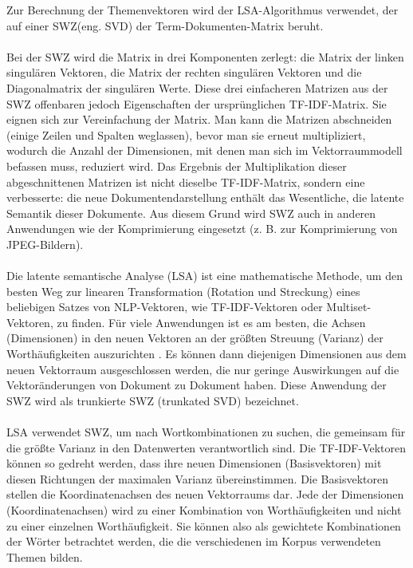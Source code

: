 Zur Berechnung der Themenvektoren wird der \ac{LSA}-Algorithmus verwendet, der auf einer \ac{SWZ}(eng. \ac{SVD}) der Term-Dokumenten-Matrix beruht.\\\\
Bei der \ac{SWZ} wird die Matrix in drei Komponenten zerlegt: die Matrix der linken singulären Vektoren, die Matrix der rechten singulären Vektoren und die Diagonalmatrix der singulären Werte. 
Diese drei einfacheren Matrizen aus der \ac{SWZ} offenbaren jedoch Eigenschaften der ursprünglichen \ac{TF-IDF}-Matrix. 
Sie eignen sich zur Vereinfachung der Matrix. 
Man kann die Matrizen abschneiden (einige Zeilen und Spalten weglassen), bevor man sie erneut multipliziert, wodurch die Anzahl der Dimensionen, mit denen man sich im Vektorraummodell befassen muss, reduziert wird. 
Das Ergebnis der Multiplikation dieser abgeschnittenen Matrizen ist nicht dieselbe \ac{TF-IDF}-Matrix, sondern eine verbesserte: die neue Dokumentendarstellung enthält das Wesentliche, die latente Semantik dieser Dokumente. 
Aus diesem Grund wird \ac{SWZ} auch in anderen Anwendungen wie der Komprimierung eingesetzt (z. B. zur Komprimierung von JPEG-Bildern).\\\\
Die latente semantische Analyse (\ac{LSA}) ist eine mathematische Methode, um den besten Weg zur linearen Transformation (Rotation und Streckung) eines beliebigen Satzes von \ac{NLP}-Vektoren, wie \ac{TF-IDF}-Vektoren oder Multiset-Vektoren, zu finden. 
Für viele Anwendungen ist es am besten, die Achsen (Dimensionen) in den neuen Vektoren an der größten Streuung (Varianz) der Worthäufigkeiten auszurichten \cite{jurafsky_speech_2009}.
Es können dann diejenigen Dimensionen aus dem neuen Vektorraum ausgeschlossen werden, die nur geringe Auswirkungen auf die Vektoränderungen von Dokument zu Dokument haben. 
Diese Anwendung der \ac{SWZ} wird als trunkierte \ac{SWZ} (trunkated \ac{SVD}) bezeichnet.\\\\
\ac{LSA} verwendet \ac{SWZ}, um nach Wortkombinationen zu suchen, die gemeinsam für die größte Varianz in den Datenwerten verantwortlich sind. 
Die \ac{TF-IDF}-Vektoren können so gedreht werden, dass ihre neuen Dimensionen (Basisvektoren) mit diesen Richtungen der maximalen Varianz übereinstimmen. 
Die Basisvektoren stellen die Koordinatenachsen des neuen Vektorraums dar. 
Jede der Dimensionen (Koordinatenachsen) wird zu einer Kombination von Worthäufigkeiten und nicht zu einer einzelnen Worthäufigkeit. 
Sie können also als gewichtete Kombinationen der Wörter betrachtet werden, die die verschiedenen im Korpus verwendeten Themen bilden. 

